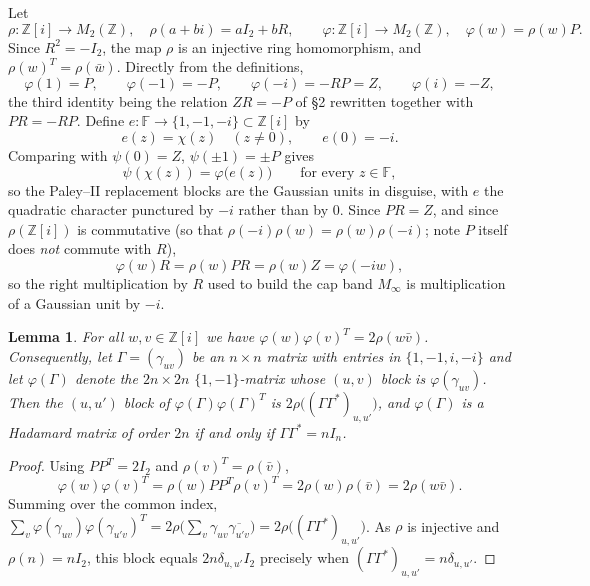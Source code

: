 \documentclass[11pt]{article}
\newtheorem{lemma}{Lemma}
\newcommand{\F}{\mathbb F}
\newcommand{\Z}{\mathbb Z}
\begin{document}
Let
\[
        \rho\colon\Z[i]\to M_2(\Z),\quad \rho(a+bi)=aI_2+bR,
        \qquad
        \varphi\colon\Z[i]\to M_2(\Z),\quad \varphi(w)=\rho(w)P .
\]
Since \(R^{2}=-I_2\), the map \(\rho\) is an injective ring homomorphism, and
\(\rho(w)^{T}=\rho(\bar w)\).  Directly from the definitions,
\[
        \varphi(1)=P,\qquad \varphi(-1)=-P,\qquad
        \varphi(-i)=-RP=Z,\qquad \varphi(i)=-Z,
\]
the third identity being the relation \(ZR=-P\) of \S2 rewritten together
with \(PR=-RP\).  Define
\(e\colon\F\to\{1,-1,-i\}\subset\Z[i]\) by
\[
        e(z)=\chi(z)\quad(z\neq0),\qquad e(0)=-i .
        \tag{6.1}\label{eq:edef}
\]
Comparing with \(\psi(0)=Z\), \(\psi(\pm1)=\pm P\) gives
\[
        \psi(\chi(z))=\varphi\bigl(e(z)\bigr)\qquad\text{for every }z\in\F ,
        \tag{6.2}\label{eq:psiphi}
\]
so the Paley--II replacement blocks are the Gaussian units in disguise, with
\(e\) the quadratic character punctured by \(-i\) rather than by \(0\).
Since \(PR=Z\), and since \(\rho(\Z[i])\) is commutative (so that
\(\rho(-i)\rho(w)=\rho(w)\rho(-i)\); note \(P\) itself does \emph{not}
commute with \(R\)),
\[
        \varphi(w)R=\rho(w)PR=\rho(w)Z=\varphi(-iw),
        \tag{6.3}\label{eq:capR}
\]
so the right multiplication by \(R\) used to build the cap band \(M_\infty\)
is multiplication of a Gaussian unit by \(-i\).

\begin{lemma}\label{lem:double}
For all \(w,v\in\Z[i]\) we have \(\varphi(w)\varphi(v)^{T}=2\rho(w\bar v)\).
Consequently, let \(\Gamma=(\gamma_{uv})\) be an \(n\times n\) matrix with
entries in \(\{1,-1,i,-i\}\) and let \(\varphi(\Gamma)\) denote the
\(2n\times2n\) \(\{1,-1\}\)-matrix whose \((u,v)\) block is
\(\varphi(\gamma_{uv})\).  Then the \((u,u')\) block of
\(\varphi(\Gamma)\varphi(\Gamma)^{T}\) is
\(2\rho\bigl((\Gamma\Gamma^{*})_{u,u'}\bigr)\), and \(\varphi(\Gamma)\) is a
Hadamard matrix of order \(2n\) if and only if \(\Gamma\Gamma^{*}=nI_n\).
\end{lemma}

\begin{proof}
Using \(PP^{T}=2I_2\) and \(\rho(v)^{T}=\rho(\bar v)\),
\[
        \varphi(w)\varphi(v)^{T}=\rho(w)PP^{T}\rho(v)^{T}
        =2\rho(w)\rho(\bar v)=2\rho(w\bar v).
\]
Summing over the common index,
\(\sum_{v}\varphi(\gamma_{uv})\varphi(\gamma_{u'v})^{T}
 =2\rho\bigl(\sum_{v}\gamma_{uv}\overline{\gamma_{u'v}}\bigr)
 =2\rho\bigl((\Gamma\Gamma^{*})_{u,u'}\bigr)\).
As \(\rho\) is injective and \(\rho(n)=nI_2\), this block equals
\(2n\delta_{u,u'}I_2\) precisely when
\((\Gamma\Gamma^{*})_{u,u'}=n\delta_{u,u'}\).
\end{proof}
\end{document}
